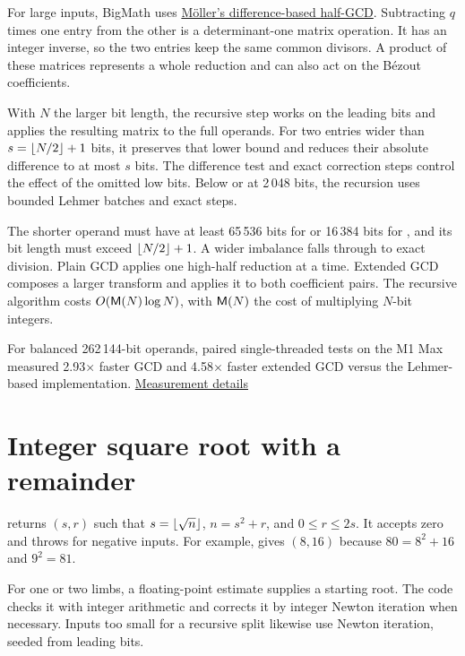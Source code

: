 For large inputs, BigMath uses \href{https://doi.org/10.1090/S0025-5718-07-02017-0}{M\"oller's difference-based half-GCD}.
Subtracting $q$ times one entry from the other is a determinant-one
matrix operation. It has an integer inverse, so the two entries keep
the same common divisors. A product of these matrices represents a
whole reduction and can also act on the B\'ezout coefficients.

With $N$ the larger bit length, the recursive step works on the leading
bits and applies the resulting matrix to the full operands. For two
entries wider than $s=\left\lfloor N/2 \right\rfloor+1$ bits, it preserves that lower bound
and reduces their absolute difference to at most $s$ bits. The difference
test and exact correction steps control the effect of the omitted low
bits. Below or at 2\,048 bits, the recursion uses bounded Lehmer batches
and exact steps.

The shorter operand must have at least 65\,536 bits for  or
16\,384 bits for , and its bit length must exceed
$\left\lfloor N/2 \right\rfloor+1$. A wider imbalance falls through to exact division.
Plain GCD applies one high-half reduction at a time. Extended GCD
composes a larger transform and applies it to both coefficient pairs.
The recursive algorithm costs $O(\mathsf{M}(N)\log N)$, with $\mathsf{M}(N)$ the
cost of multiplying $N$-bit integers.

\begin{perfnote}
For balanced 262\,144-bit operands, paired single-threaded tests on
the M1 Max measured 2.93$\times$ faster GCD and 4.58$\times$ faster
extended GCD versus the Lehmer-based implementation.
\href{https://github.com/mmurshed/biginteger/blob/main/BENCHMARK.md\#recursive-half-gcd}{Measurement details}
\end{perfnote}

\section{Integer square root with a remainder}
\label{sec:sqrtrem}

 returns $(s,r)$ such that
$s=\left\lfloor \sqrt n \right\rfloor$, $n=s^2+r$, and $0\le r\le 2s$.
It accepts zero and throws for negative inputs. For example, 
gives $(8,16)$ because $80=8^2+16$ and $9^2=81$.

For one or two limbs, a floating-point estimate supplies a starting root.
The code checks it with integer arithmetic and corrects it by integer Newton
iteration when necessary. Inputs too small for a recursive split likewise
use Newton iteration, seeded from leading bits.

